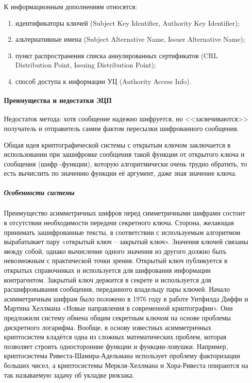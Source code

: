 \noindent К информационным дополнениям относятся:
\begin{enumerate}
  \item идентификаторы ключей (Subject Key Identifier, Authority Key Identifier);
  \item альтернативные имена (Subject Alternative Name, Issuer Alternative Name);
  \item пункт распространения списка аннулированных сертификатов (CRL
      Distribution Point, Issuing Distribution Point);
  \item способ доступа к информации УЦ (Authority Access Info).

\end{enumerate}

\paragraph{Преимущества и недостатки ЭЦП}

Недостаток метода: хотя сообщение надежно шифруется, но <<засвечиваются>>
получатель и отправитель самим фактом пересылки шифрованного сообщения.

Общая идея криптографической системы с открытым ключом заключается в
использовании при зашифровке сообщения такой функции от открытого ключа и
сообщения (шифр -функции), которую алгоритмически очень трудно обратить, то
есть вычислить по значению функции её аргумент, даже зная значение ключа.

\subparagraph{Особенности системы }

Преимущество асимметричных шифров перед симметричными шифрами состоит в
отсутствии необходимости передачи секретного ключа. Сторона, желающая
принимать зашифрованные тексты, в соответствии с используемым алгоритмом
вырабатывает пару «открытый ключ -- закрытый ключ». Значения ключей связаны
между собой, однако вычисление одного значения из другого должно быть
невозможным с практической точки зрения. Открытый ключ публикуется в открытых
справочниках и используется для шифрования информации контрагентом. Закрытый
ключ держится в секрете и используется для расшифровывания сообщения,
переданного владельцу пары ключей. Начало асимметричным шифрам было положено
в 1976 году в работе Уитфилда Диффи и Мартина Хеллмана «Новые направления в
современной криптографии». Они предложили систему обмена общим секретным
ключом на основе проблемы дискретного логарифма. Вообще, в основу известных
асимметричных криптосистем кладётся одна из сложных математических проблем,
которая позволяет строить односторонние функции и функции-ловушки. Например,
криптосистема Ривеста-Шамира-Адельмана использует проблему факторизации
больших чисел, а криптосистемы Меркля-Хеллмана и Хора-Ривеста опираются на
так называемую задачу об укладке рюкзака.

